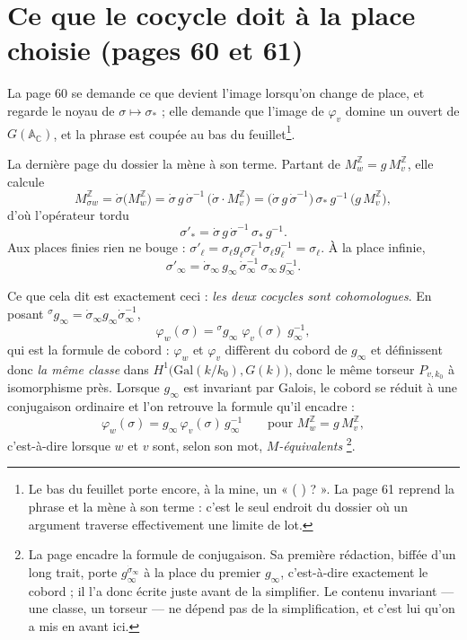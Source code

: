 \documentclass[11pt,a4paper]{article}
\begin{document}
\section*{Ce que le cocycle doit à la place choisie (pages 60 et 61)}

La page 60 se demande ce que devient l'image lorsqu'on change de place, et
regarde le noyau de $\sigma \mapsto \sigma_{*}$ ; elle demande que l'image de
$\varphi_{v}$ domine un ouvert de $G(\mathbb{A}_{\mathbb{C}})$, et la phrase est
coupée au bas du feuillet\footnote{Le bas du feuillet porte encore, à la mine,
un « ( ) ? ». La page 61 reprend la phrase et la mène à son terme : c'est le
seul endroit du dossier où un argument traverse effectivement une limite de lot.}.

La dernière page du dossier la mène à son terme. Partant de
$M^{\mathbb{Z}}_{w} = g\, M^{\mathbb{Z}}_{v}$, elle calcule
\[
  M^{\mathbb{Z}}_{\sigma w} = \dot{\sigma}\bigl(M^{\mathbb{Z}}_{w}\bigr)
  = \dot{\sigma}\, g\, \dot{\sigma}^{-1}\,
    \bigl(\dot{\sigma} \cdot M^{\mathbb{Z}}_{v}\bigr)
  = \bigl(\dot{\sigma}\, g\, \dot{\sigma}^{-1}\bigr)\, \sigma_{*}\, g^{-1}\,
    \bigl(g\, M^{\mathbb{Z}}_{v}\bigr) ,
\]
d'où l'opérateur tordu
\[
  \sigma'_{*} = \dot{\sigma}\, g\, \dot{\sigma}^{-1}\, \sigma_{*}\, g^{-1} .
\]
Aux places finies rien ne bouge :
$\sigma'_{\ell} = \sigma_{\ell} g_{\ell} \sigma_{\ell}^{-1} \sigma_{\ell}
g_{\ell}^{-1} = \sigma_{\ell}$. À la place infinie,
\[
  \sigma'_{\infty} = \dot{\sigma}_{\infty}\, g_{\infty}\,
  \dot{\sigma}_{\infty}^{-1}\, \sigma_{\infty}\, g_{\infty}^{-1} .
\]

Ce que cela dit est exactement ceci : \emph{les deux cocycles sont
cohomologues}. En posant ${}^{\sigma}g_{\infty} = \dot{\sigma}_{\infty}
g_{\infty} \dot{\sigma}_{\infty}^{-1}$,
\[
  \varphi_{w}(\sigma) = {}^{\sigma}g_{\infty}\; \varphi_{v}(\sigma)\;
  g_{\infty}^{-1} ,
\]
qui est la formule de cobord : $\varphi_{w}$ et $\varphi_{v}$ diffèrent du
cobord de $g_{\infty}$ et définissent donc \emph{la même classe} dans
$H^{1}\bigl(\mathrm{Gal}(k/k_{0}), G(k)\bigr)$, donc le même torseur
$P_{v,k_{0}}$ à isomorphisme près. Lorsque $g_{\infty}$ est invariant par
Galois, le cobord se réduit à une conjugaison ordinaire et l'on retrouve la
formule qu'il encadre :
\[
  \varphi_{w}(\sigma) = g_{\infty}\, \varphi_{v}(\sigma)\, g_{\infty}^{-1}
  \qquad \text{pour } M^{\mathbb{Z}}_{w} = g\, M^{\mathbb{Z}}_{v} ,
\]
c'est-à-dire lorsque $w$ et $v$ sont, selon son mot, \emph{$M$-équivalents}
\footnote{La page encadre la formule de conjugaison. Sa première rédaction,
biffée d'un long trait, porte $g_{\infty}^{\dot{\sigma}_{\infty}}$ à la place du
premier $g_{\infty}$, c'est-à-dire exactement le cobord ; il l'a donc écrite
juste avant de la simplifier. Le contenu invariant — une classe, un torseur — ne
dépend pas de la simplification, et c'est lui qu'on a mis en avant ici.}.
\end{document}
